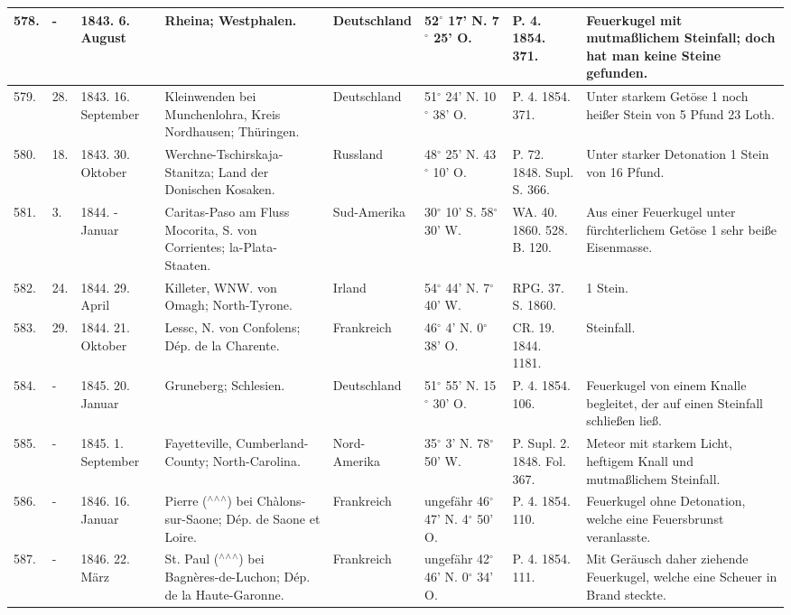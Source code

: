 \documentclass[a4paper, 11pt, oneside, polutonikogreek, german]{article}
\begin{document}
\begin{table}[!ht]
\begin{tabular}{|l|l|l|l|l|l|l|l|}
        578. & - & 1843. 6. August & Rheina; Westphalen. & Deutschland & 52$^\circ$ 17' N. 7$^\circ$ 25' O. & P. 4. 1854. 371. & Feuerkugel mit mutmaßlichem Steinfall; doch hat man keine Steine gefunden. \\ \hline
        579. & 28. & 1843. 16. September & Kleinwenden bei Munchenlohra, Kreis Nordhausen; Thüringen. & Deutschland & 51$^\circ$ 24' N. 10$^\circ$ 38' O. & P. 4. 1854. 371. & Unter starkem Getöse 1 noch heißer Stein von 5 Pfund 23 Loth. \\ \hline
        580. & 18. & 1843. 30. Oktober & Werchne-Tschirskaja-Stanitza; Land der Donischen Kosaken. & Russland & 48$^\circ$ 25' N. 43$^\circ$ 10' O. & P. 72. 1848. Supl. S. 366. & Unter starker Detonation 1 Stein von 16 Pfund. \\ \hline
        581. & 3. & 1844. - Januar & Caritas-Paso am Fluss Mocorita, S. von Corrientes; la-Plata-Staaten. & Sud-Amerika & 30$^\circ$ 10' S. 58$^\circ$ 30' W. & WA. 40. 1860. 528. B. 120. & Aus einer Feuerkugel unter fürchterlichem Getöse 1 sehr beiße Eisenmasse. \\ \hline
        582. & 24. & 1844. 29. April & Killeter, WNW. von Omagh; North-Tyrone. & Irland & 54$^\circ$ 44' N. 7$^\circ$ 40' W. & RPG. 37. S. 1860. & 1 Stein. \\ \hline
        583. & 29. & 1844. 21. Oktober & Lessc, N. von Confolens; Dép. de la Charente. & Frankreich & 46$^\circ$ 4' N. 0$^\circ$ 38' O. & CR. 19. 1844. 1181. & Steinfall. \\ \hline
        584. & - & 1845. 20. Januar & Gruneberg; Schlesien. & Deutschland & 51$^\circ$ 55' N. 15$^\circ$ 30' O. & P. 4. 1854. 106. & Feuerkugel von einem Knalle begleitet, der auf einen Steinfall schließen ließ. \\ \hline
        585. & - & 1845. 1. September & Fayetteville, Cumberland-County; North-Carolina. & Nord-Amerika & 35$^\circ$ 3' N. 78$^\circ$ 50' W. & P. Supl. 2. 1848. Fol. 367. & Meteor mit starkem Licht, heftigem Knall und mutmaßlichem Steinfall. \\ \hline
        586. & - & 1846. 16. Januar & Pierre ($^\wedge$$^\wedge$$^\wedge$) bei Chàlons-sur-Saone; Dép. de Saone et Loire. & Frankreich & ungefähr 46$^\circ$ 47' N. 4$^\circ$ 50' O. & P. 4. 1854. 110. & Feuerkugel ohne Detonation, welche eine Feuersbrunst veranlasste. \\ \hline
        587. & - & 1846. 22. März & St. Paul ($^\wedge$$^\wedge$$^\wedge$) bei Bagnères-de-Luchon; Dép. de la Haute-Garonne. & Frankreich & ungefähr 42$^\circ$ 46' N. 0$^\circ$ 34' O. & P. 4. 1854. 111. & Mit Geräusch daher ziehende Feuerkugel, welche eine Scheuer in Brand steckte. \\ \hline

\end{tabular}
\end{table}
\end{document}
